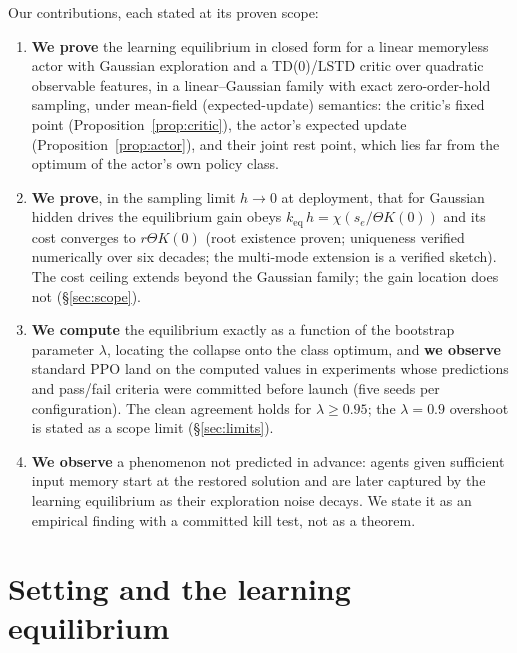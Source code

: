 \documentclass[11pt]{article}
\newcommand{\keq}{k_{\mathrm{eq}}}
\begin{document}
Our contributions, each stated at its proven scope:

\begin{enumerate}[leftmargin=1.6em,itemsep=2pt]
\item \textbf{We prove} the learning equilibrium in closed form for a linear memoryless actor
with Gaussian exploration and a TD(0)/LSTD critic over quadratic observable features, in a
linear--Gaussian family with exact zero-order-hold sampling, under mean-field (expected-update)
semantics: the critic's fixed point (Proposition~\ref{prop:critic}), the actor's expected
update (Proposition~\ref{prop:actor}), and their joint rest point, which lies far from the
optimum of the actor's own policy class.
\item \textbf{We prove}, in the sampling limit $h \to 0$ at deployment, that for Gaussian
hidden drives the equilibrium gain obeys $\keq\, h = \chi(s_e/\Theta K(0))$ and its cost
converges to $r\Theta K(0)$ (root existence proven; uniqueness verified numerically over six
decades; the multi-mode extension is a verified sketch). The cost ceiling extends beyond the
Gaussian family; the gain location does not (\S\ref{sec:scope}).
\item \textbf{We compute} the equilibrium exactly as a function of the bootstrap parameter
$\lambda$, locating the collapse onto the class optimum, and \textbf{we observe} standard PPO
land on the computed values in experiments whose predictions and pass/fail criteria were
committed before launch (five seeds per configuration). The clean agreement holds for
$\lambda \ge 0.95$; the $\lambda = 0.9$ overshoot is stated as a scope limit
(\S\ref{sec:limits}).
\item \textbf{We observe} a phenomenon not predicted in advance: agents given sufficient input
memory start at the restored solution and are later captured by the learning equilibrium as
their exploration noise decays. We state it as an empirical finding with a committed kill
test, not as a theorem.
\end{enumerate}

\section{Setting and the learning equilibrium}
\end{document}
